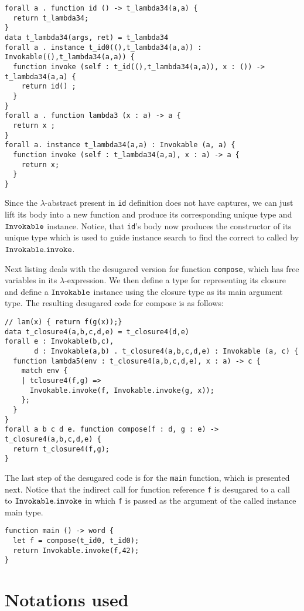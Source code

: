 \documentclass[a4paper, 11pt]{article}
\begin{document}
\begin{lstlisting}
forall a . function id () -> t_lambda34(a,a) {
  return t_lambda34;
}
data t_lambda34(args, ret) = t_lambda34
forall a . instance t_id0((),t_lambda34(a,a)) : Invokable((),t_lambda34(a,a)) {
  function invoke (self : t_id((),t_lambda34(a,a)), x : ()) -> t_lambda34(a,a) {
    return id() ;
  }
}
forall a . function lambda3 (x : a) -> a {
  return x ; 
}
forall a. instance t_lambda34(a,a) : Invokable (a, a) {
  function invoke (self : t_lambda34(a,a), x : a) -> a {
    return x;
  }
}
\end{lstlisting}
Since the $\lambda$-abstract present in \texttt{id} definition does 
not have captures, we can just lift its body into a 
new function and produce its corresponding unique type 
and $\mathtt{Invokable}$ instance. Notice, that \texttt{id}'s 
body now produces the constructor of its unique type 
which is used to guide instance search to find the 
correct to called by $\mathtt{Invokable.invoke}$.

Next listing deals with the desugared version for function 
\texttt{compose}, which has free variables in its 
$\lambda$-expression. We then define a type for representing 
its closure and define a $\mathtt{Invokable}$ instance using the 
closure type as its main argument type. The resulting 
desugared code for compose is as follows:

\begin{lstlisting}
// lam(x) { return f(g(x));}
data t_closure4(a,b,c,d,e) = t_closure4(d,e) 
forall e : Invokable(b,c), 
       d : Invokable(a,b) . t_closure4(a,b,c,d,e) : Invokable (a, c) { 
  function lambda5(env : t_closure4(a,b,c,d,e), x : a) -> c {
    match env {
    | tclosure4(f,g) => 
      Invokable.invoke(f, Invokable.invoke(g, x));
    };
  }
}
forall a b c d e. function compose(f : d, g : e) -> t_closure4(a,b,c,d,e) {
  return t_closure4(f,g);
}
\end{lstlisting}

The last step of the desugared code is for the \texttt{main} function, which 
is presented next. Notice that the indirect call for function reference 
\texttt{f} is desugared to a call to $\mathtt{Invokable.invoke}$ in which \texttt{f} is 
passed as the argument of the called instance main type.

\begin{lstlisting}
function main () -> word {
  let f = compose(t_id0, t_id0);
  return Invokable.invoke(f,42);
}
\end{lstlisting}


\section{Notations used}\label{sec:notations} 
\end{document}

